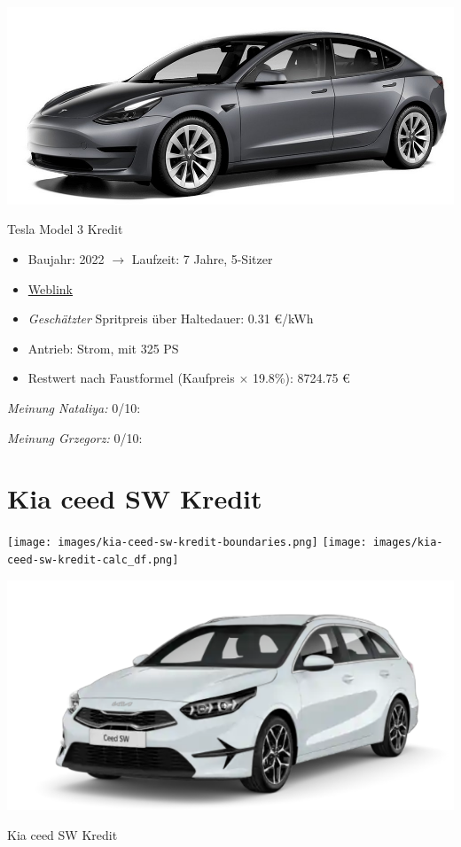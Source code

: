 \documentclass[landscape, DIV=99, 14pt]{scrartcl}
\begin{document}
\pagebreak
\begin{center}
\includegraphics[width=0.9\columnwidth]{cars/tesla-model-3.jpg}

Tesla Model 3 Kredit
\end{center}

\begin{itemize}
    \item Baujahr: 2022 $\rightarrow$ Laufzeit: 7 Jahre, 5-Sitzer
    \item \href{https://www.tesla.com/de_de/model3/design\#overview}{Weblink}
    \item \emph{Gesch\"atzter} Spritpreis \"uber Haltedauer: 0.31 \euro{}/kWh
    \item Antrieb: Strom, mit 325 PS
    \item Restwert nach Faustformel (Kaufpreis $\times$ 19.8\%): 8724.75 \euro{}
\end{itemize}

\begin{small}
\emph{Meinung Nataliya:} 0/10: 
        
\emph{Meinung Grzegorz:} 0/10: 
\end{small}

\pagebreak


\twocolumn

\section*{Kia ceed SW Kredit}
\begin{center}
\texttt{[image: images/kia-ceed-sw-kredit-boundaries.png]}
\null
\vspace{0.5cm}
\texttt{[image: images/kia-ceed-sw-kredit-calc\_df.png]}
\end{center}

\pagebreak
\begin{center}
\includegraphics[width=0.9\columnwidth]{cars/kia-ceed-sportswagon.png}

Kia ceed SW Kredit
\end{center}
\end{document}
